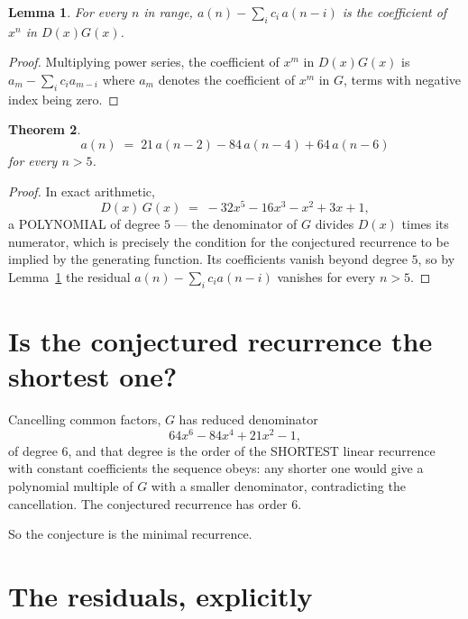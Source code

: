 \documentclass[11pt,a4paper]{article}
\theoremstyle{plain}
\newtheorem{theorem}{Theorem}
\newtheorem{lemma}[theorem]{Lemma}
\theoremstyle{definition}
\begin{document}
\begin{lemma}\label{lem:key}
For every $n$ in range, $a(n)-\sum_i c_i\,a(n-i)$ is the coefficient of $x^{n}$ in
$D(x)G(x)$.
\end{lemma}

\begin{proof}
Multiplying power series, the coefficient of $x^{m}$ in $D(x)G(x)$ is
$a_m-\sum_i c_i a_{m-i}$ where $a_m$ denotes the coefficient of $x^{m}$ in $G$, terms with
negative index being zero.
\end{proof}

\begin{theorem}
\[
a(n)\;=\;21\,a(n-2) - 84\,a(n-4) + 64\,a(n-6)
\]
for every $n>5$.
\end{theorem}

\begin{proof}
In exact arithmetic,
\[
D(x)\,G(x)\;=\;- 32 x^{5} - 16 x^{3} - x^{2} + 3 x + 1,
\]
a POLYNOMIAL of degree $5$ --- the denominator of $G$ divides $D(x)$ times its numerator,
which is precisely the condition for the conjectured recurrence to be implied by the
generating function. Its coefficients vanish beyond degree $5$, so by
Lemma~\ref{lem:key} the residual $a(n)-\sum_ic_ia(n-i)$ vanishes for every
$n>5$.
\end{proof}

\section{Is the conjectured recurrence the shortest one?}

Cancelling common factors, $G$ has reduced denominator
\[
64 x^{6} - 84 x^{4} + 21 x^{2} - 1,
\]
of degree $6$, and that degree is the order of the SHORTEST linear recurrence with
constant coefficients the sequence obeys: any shorter one would give a polynomial multiple of
$G$ with a smaller denominator, contradicting the cancellation. The conjectured recurrence has
order $6$.

So the conjecture is the minimal recurrence.

\section{The residuals, explicitly}
\end{document}
